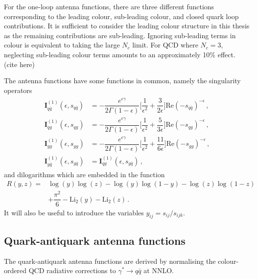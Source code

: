 \documentclass[main.tex]{subfiles}
\begin{document}
    For the one-loop antenna functions, there are three
    different functions corresponding to the leading colour,
    sub-leading colour, and closed quark loop contributions.
    It is sufficient to consider the leading colour
    structure in this thesis as the remaining contributions
    are sub-leading. Ignoring sub-leading terms in
    colour is equivalent to taking the large $N_{c}$
    limit. For QCD where $N_{c} = 3$, neglecting
    sub-leading colour terms amounts to an
    approximately 10\% effect. (cite here)

    The antenna functions have some functions in common,
    namely the singularity operators
    \begin{align}\label{eqn:singularity_operators}
        \begin{split}
        \mathbf{I}_{q\bar{q}}^{(1)}(\epsilon, s_{q\bar{q}}) &= -\dfrac{e^{\epsilon\gamma}}{2\Gamma(1-\epsilon)} \bigg[\dfrac{1}{\epsilon^{2}} + \dfrac{3}{2\epsilon}\bigg] \mathrm{Re}(-s_{q\bar{q}})^{-\epsilon} \, , \\
        \mathbf{I}_{qg}^{(1)}(\epsilon, s_{qg}) &= -\dfrac{e^{\epsilon\gamma}}{2\Gamma(1-\epsilon)} \bigg[\dfrac{1}{\epsilon^{2}} + \dfrac{5}{3\epsilon}\bigg] \mathrm{Re}(-s_{qg})^{-\epsilon} \, , \\
        \mathbf{I}_{gg}^{(1)}(\epsilon, s_{gg}) &= -\dfrac{e^{\epsilon\gamma}}{2\Gamma(1-\epsilon)} \bigg[\dfrac{1}{\epsilon^{2}} + \dfrac{11}{6\epsilon}\bigg] \mathrm{Re}(-s_{gg})^{-\epsilon} \, , \\
        \mathbf{I}^{(1)}_{g\bar{q}}(\epsilon, s_{g\bar{q}}) &= \mathbf{I}_{qg}^{(1)}(\epsilon,s_{g\bar{q}}) \, ,
        \end{split}
    \end{align}
    and dilogarithms which are embedded in the function
    \begin{equation}\label{eqn:R}
        \begin{split}
        R(y, z) = &\log{(y)}\log{(z)} - \log{(y)}\log{(1-y)} - \log{(z)}\log{(1-z)} \\
        &+ \dfrac{\pi^{2}}{6} - \mathrm{Li}_{2}(y) - \mathrm{Li}_{2}(z) \, .
        \end{split}
    \end{equation}
    It will also be useful to introduce the variables $y_{ij} = s_{ij}/s_{ijk}$.

    \subsection{Quark-antiquark antenna functions}
    The quark-antiquark antenna functions are derived by normalising
    the colour-ordered QCD radiative corrections to $\gamma^{*} \rightarrow q \bar{q}$
    at NNLO.
\end{document}

